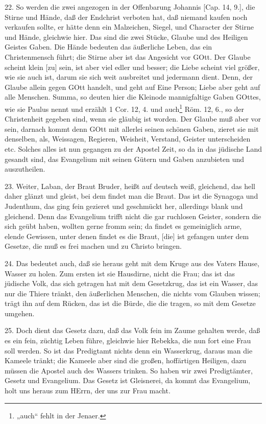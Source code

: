 22. So werden die zwei angezogen in der Offenbarung Johannis [Cap. 14, 9.], die Stirne und Hände, daß der Endchrist verboten hat, daß niemand kaufen noch verkaufen sollte, er hätte denn ein Malzeichen, Siegel, und Character der Stirne und Hände, gleichwie hier. Das sind die zwei Stücke, Glaube und des Heiligen Geistes Gaben. Die Hände bedeuten das äußerliche Leben, das ein Christenmensch führt; die Stirne aber ist das Angesicht vor GOtt. Der Glaube scheint klein [zu] sein, ist aber viel edler und besser; die Liebe scheint viel größer, wie sie auch ist, darum sie sich weit ausbreitet und jedermann dient. Denn, der Glaube allein gegen GOtt handelt, und geht auf Eine Person; Liebe aber geht auf alle Menschen. Summa, so deuten hier die Kleinode mannigfaltige Gaben GOttes, wie sie Paulus nennt und erzählt 1 Cor. 12, 4. und auch\footnote{„auch“ fehlt in der Jenaer.} Röm. 12, 6., so der Christenheit gegeben sind, wenn sie gläubig ist worden. Der Glaube muß aber vor sein, darnach kommt denn GOtt mit allerlei seinen schönen Gaben, zieret sie mit denselben, als, Weissagen, Regieren, Weisheit, Verstand, Geister unterscheiden etc. Solches alles ist nun gegangen zu der Apostel Zeit, so da in das jüdische Land gesandt sind,
das Evangelium mit seinen Gütern und Gaben anzubieten und auszutheilen.

23. Weiter, Laban, der Braut Bruder, heißt auf deutsch weiß, gleichend, das hell daher glänzt und gleist, bei dem findet man die Braut. Das ist die Synagoga und Judenthum, das ging fein gezieret und geschmückt her, allerdings blank und gleichend. Denn das Evangelium trifft nicht die gar ruchlosen Geister, sondern die sich geübt haben, wollten gerne fromm sein; da findet es gemeiniglich arme, elende Gewissen, unter denen findet es die Braut, [die] ist gefangen unter dem Gesetze, die muß es frei machen und zu Christo bringen.

24. Das bedeutet auch, daß sie heraus geht mit dem Kruge aus des Vaters Hause, Wasser zu holen. Zum ersten ist sie Hausdirne, nicht die Frau; das ist das jüdische Volk, das sich getragen hat mit dem Gesetzkrug, das ist ein Wasser, das nur die Thiere tränkt, den äußerlichen Menschen, die nichts vom Glauben wissen; trägt ihn auf dem Rücken, das ist die Bürde, die die tragen, so mit dem Gesetze umgehen.

25. Doch dient das Gesetz dazu, daß das Volk fein im Zaume gehalten werde, daß es ein fein, züchtig Leben führe, gleichwie hier Rebekka, die nun fort eine Frau soll werden. So ist das Predigtamt nichts denn ein Wasserkrug, daraus man die Kameele tränkt; die Kameele aber sind die großen, hoffärtigen Heiligen, dazu müssen die Apostel auch des Wassers trinken. So haben wir zwei Predigtämter, Gesetz und Evangelium. Das Gesetz ist Gleisnerei, da kommt das Evangelium, holt uns heraus zum HErrn, der uns zur Frau macht.


